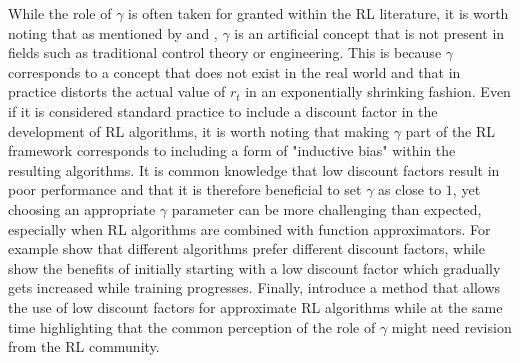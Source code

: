 While the role of $\gamma$ is often taken for granted within the RL literature, it is worth noting that as mentioned by \citet{hessel2019inductive} and \citet{schmidhuber2019reinforcement}, $\gamma$ is an artificial concept that is not present in fields such as traditional control theory or engineering. This is because $\gamma$ corresponds to a concept that does not exist in the real world and that in practice distorts the actual value of $r_t$ in an exponentially shrinking fashion. Even if it is considered standard practice to include a discount factor in the development of RL algorithms, it is worth noting that making $\gamma$ part of the RL framework corresponds to including a form of "inductive bias" within the resulting algorithms. It is common knowledge that low discount factors result in poor performance and that it is therefore beneficial to set $\gamma$ as close to $1$, yet choosing an appropriate $\gamma$ parameter can be more challenging than expected, especially when RL algorithms are combined with function approximators. For example \citet{wiering2009qv} show that different algorithms prefer different discount factors, while \citet{franccois2015discount} show the benefits of initially starting with a low discount factor which gradually gets increased while training progresses. Finally, \citet{vanseijen2019using} introduce a method that allows the use of low discount factors for approximate RL algorithms while at the same time highlighting that the common perception of the role of $\gamma$ might need revision from the RL community.             

